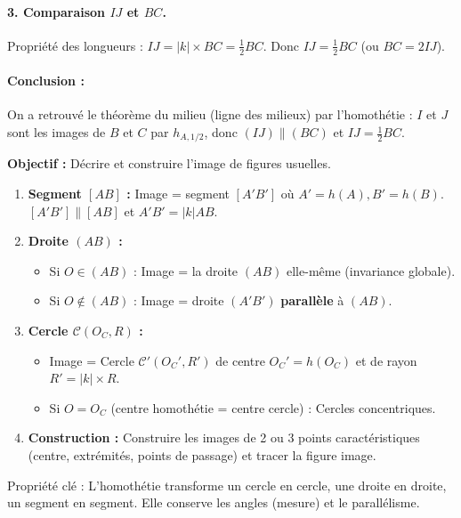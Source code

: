 \documentclass[11pt]{article}
\newcommand{\cle}[1]{{\popxbold\color{popdark}#1}}
\begin{document}
\begin{exoresolu}
\paragraph{3. Comparaison $IJ$ et $BC$.}
Propriété des longueurs : $IJ = |k| \times BC = \frac{1}{2} BC$.
Donc \textbf{$IJ = \frac{1}{2} BC$} (ou $BC = 2 IJ$).
\paragraph{Conclusion :} On a retrouvé le théorème du milieu (ligne des milieux) par l'homothétie : $I$ et $J$ sont les images de $B$ et $C$ par $h_{A, 1/2}$, donc $(IJ) \parallel (BC)$ et $IJ = \frac{1}{2} BC$.
\end{exoresolu}

\begin{methode}
\textbf{Objectif :} Décrire et construire l'image de figures usuelles.
\begin{enumerate}
    \item \textbf{Segment $[AB]$ :} Image = segment $[A'B']$ où $A'=h(A), B'=h(B)$. $[A'B'] \parallel [AB]$ et $A'B' = |k| AB$.
    \item \textbf{Droite $(AB)$ :}
    \begin{itemize}
        \item Si $O \in (AB)$ : Image = la droite $(AB)$ elle-même (invariance globale).
        \item Si $O \notin (AB)$ : Image = droite $(A'B')$ \textbf{parallèle} à $(AB)$.
    \end{itemize}
    \item \textbf{Cercle $\mathcal{C}(O_C, R)$ :}
    \begin{itemize}
        \item Image = Cercle $\mathcal{C}'(O_C', R')$ de centre $O_C' = h(O_C)$ et de rayon $R' = |k| \times R$.
        \item Si $O = O_C$ (centre homothétie = centre cercle) : Cercles concentriques.
    \end{itemize}
    \item \textbf{Construction :} Construire les images de 2 ou 3 points caractéristiques (centre, extrémités, points de passage) et tracer la figure image.
\end{enumerate}
\cle{Propriété clé} : L'homothétie transforme un cercle en cercle, une droite en droite, un segment en segment. Elle conserve les angles (mesure) et le parallélisme.
\end{methode}
\end{document}
